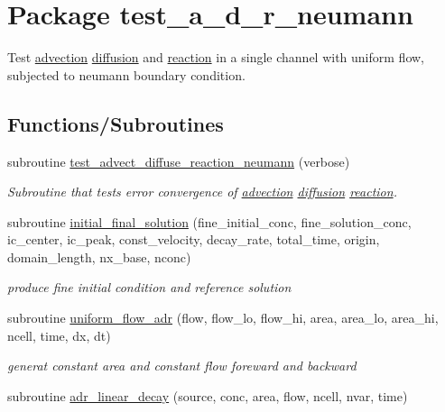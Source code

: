 \hypertarget{a00073}{
\section{Package test\_\-a\_\-d\_\-r\_\-neumann}
\label{a00073}
}
Test \hyperlink{a00052}{advection} \hyperlink{a00056}{diffusion} and \hyperlink{a00068}{reaction} in a single channel with uniform flow, subjected to neumann boundary condition.  


\subsection*{Functions/Subroutines}
\begin{CompactItemize}
\item 
subroutine \hyperlink{a00073_b372cb5a88b5e4676a429d2b7480e751}{test\_\-advect\_\-diffuse\_\-reaction\_\-neumann} (verbose)
\begin{CompactList}\small\item\em Subroutine that tests error convergence of \hyperlink{a00052}{advection} \hyperlink{a00056}{diffusion} \hyperlink{a00068}{reaction}. \item\end{CompactList}\item 
subroutine \hyperlink{a00073_9f20e21758429fe71c04c49fb7669c5d}{initial\_\-final\_\-solution} (fine\_\-initial\_\-conc, fine\_\-solution\_\-conc, ic\_\-center, ic\_\-peak, const\_\-velocity, decay\_\-rate, total\_\-time, origin, domain\_\-length, nx\_\-base, nconc)
\begin{CompactList}\small\item\em produce fine initial condition and reference solution \item\end{CompactList}\item 
subroutine \hyperlink{a00073_4b815140b3893ced6a09ae8dcd52f86b}{uniform\_\-flow\_\-adr} (flow, flow\_\-lo, flow\_\-hi, area, area\_\-lo, area\_\-hi, ncell, time, dx, dt)
\begin{CompactList}\small\item\em generat constant area and constant flow foreward and backward \item\end{CompactList}\item 
subroutine \hyperlink{a00073_933654fc0ee3665286bb1c6530fbf363}{adr\_\-linear\_\-decay} (source, conc, area, flow, ncell, nvar, time)
\item 

\end{CompactItemize}
